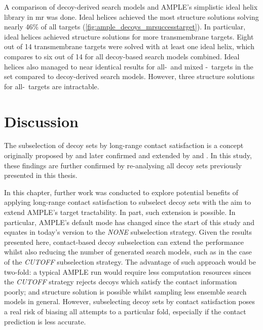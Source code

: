 A comparison of decoy-derived search models and AMPLE's simplistic ideal helix library \cite{Thomas2015-wu} in \gls{mr} was done. Ideal helices achieved the most structure solutions solving nearly 46\% of all targets (\cref{fig:ample_decoys_mrsuccesstarget}). In particular, ideal helices achieved structure solutions for more transmembrane targets. Eight out of 14 transmembrane targets were solved with at least one ideal helix, which compares to six out of 14 for all decoy-based search models combined. Ideal helices also managed to near identical results for all-\textalpha\ and mixed \textalpha-\textbeta\ targets in the set compared to decoy-derived search models. However, three structure solutions for all-\textbeta\ targets are intractable.

\section{Discussion}
The subselection of decoy sets by long-range contact satisfaction is a concept originally proposed by \textcite{Kosciolek2014-bt} and later confirmed and extended by \textcite{De_Oliveira2017-gj} and \textcite{Adhikari2018-lj}. In this study, these findings are further confirmed by re-analysing all decoy sets previously presented in this thesis. 

In this chapter, further work was conducted to explore potential benefits of applying long-range contact satisfaction to subselect decoy sets with the aim to extend AMPLE's target tractability. In part, such extension is possible. In particular, AMPLE's default mode has changed since the start of this study and equates in today's version to the \textit{NONE} subselection strategy. Given the results presented here, contact-based decoy subselection can extend the performance whilst also reducing the number of generated search models, such as in the case of the \textit{CUTOFF} subselection strategy. The advantage of such approach would be two-fold: a typical AMPLE run would require less computation resources sinces the \textit{CUTOFF} strategy rejects decoys which satisfy the contact information poorly; and structure solution is possible whilst sampling less ensemble search models in general. However, subselecting decoy sets by contact satisfaction poses a real risk of biasing all attempts to a particular fold, especially if the contact prediction is less accurate.


